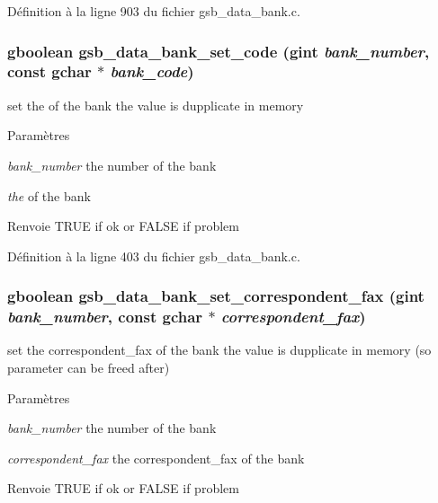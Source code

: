 Définition à la ligne 903 du fichier gsb\_\-data\_\-bank.c.

\subsubsection[{gsb\_\-data\_\-bank\_\-set\_\-code}]{\setlength{\rightskip}{0pt plus 5cm}gboolean gsb\_\-data\_\-bank\_\-set\_\-code (gint {\em bank\_\-number}, \/  const gchar $\ast$ {\em bank\_\-code})}\label{gsb__data__bank_8c_ae0050bb9642075d3aab11bcf303eb6d4}
set the of the bank the value is dupplicate in memory


\begin{DoxyParams}{Paramètres}
\item[{\em bank\_\-number}]the number of the bank \item[{\em the}]of the bank\end{DoxyParams}
\begin{DoxyReturn}{Renvoie}
TRUE if ok or FALSE if problem 
\end{DoxyReturn}


Définition à la ligne 403 du fichier gsb\_\-data\_\-bank.c.

\subsubsection[{gsb\_\-data\_\-bank\_\-set\_\-correspondent\_\-fax}]{\setlength{\rightskip}{0pt plus 5cm}gboolean gsb\_\-data\_\-bank\_\-set\_\-correspondent\_\-fax (gint {\em bank\_\-number}, \/  const gchar $\ast$ {\em correspondent\_\-fax})}\label{gsb__data__bank_8c_a574e0eb451d4d7bc9d10ee6a19d61748}
set the correspondent\_\-fax of the bank the value is dupplicate in memory (so parameter can be freed after)


\begin{DoxyParams}{Paramètres}
\item[{\em bank\_\-number}]the number of the bank \item[{\em correspondent\_\-fax}]the correspondent\_\-fax of the bank\end{DoxyParams}
\begin{DoxyReturn}{Renvoie}
TRUE if ok or FALSE if problem 
\end{DoxyReturn}


